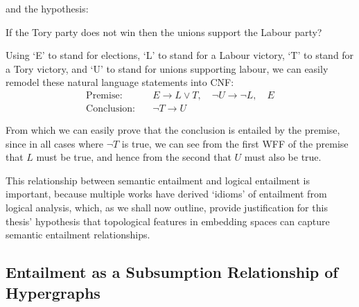\documentclass[12pt,twoside]{report}
\begin{document}
\par and the hypothesis:
\begin{flushleft}
If the Tory party does not win then the unions
support the Labour party?    
\end{flushleft}

Using `E' to stand for elections, `L' to stand for a Labour victory, `T' to stand for a Tory victory, and `U' to stand for unions supporting labour, we can easily remodel these natural language statements into CNF: \newline 
\begin{align*}
\text{Premise:} \quad & E \rightarrow L \lor T, \quad \lnot U \rightarrow \lnot L, \quad E \\
\text{Conclusion:} \quad & \lnot T \rightarrow U
\end{align*}

From which we can easily prove that the conclusion is entailed by the premise, since in all cases where $\lnot T$ is true, we can see from the first WFF of the premise that $L$ must be true, and hence from the second that $U$ must also be true. \newline \par

This relationship between semantic entailment and logical entailment is important, because multiple works have derived `idioms' of entailment from logical analysis, which, as we shall now outline, provide justification for this thesis' hypothesis that topological features in embedding spaces can capture semantic entailment relationships. 

\subsection{Entailment as a Subsumption Relationship of Hypergraphs}
\end{document}
